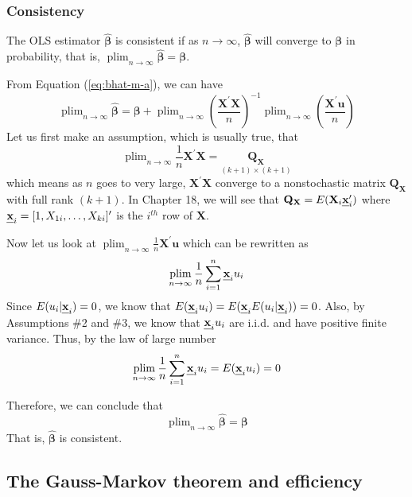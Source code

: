 \documentclass[a4paper,11pt]{article}
\DeclareMathOperator*{\plim}{plim}
\def\mathbi#1{\textbf{\em #1}}
\begin{document}
\subsubsection*{Consistency}
\label{sec:orgd0e2098}

The OLS estimator \(\hat{\boldsymbol{\beta}}\) is consistent if as \(n
\rightarrow \infty\), \(\hat{\boldsymbol{\beta}}\) will converge to
\(\boldsymbol{\beta}\) in probability, that is, \(\plim_{n \rightarrow
\infty} \hat{\boldsymbol{\beta}} = \boldsymbol{\beta}\).

From Equation (\ref{eq:bhat-m-a}), we can have
\begin{equation*}
\plim_{n \rightarrow \infty} \hat{\boldsymbol{\beta}} = \boldsymbol{\beta} + \plim_{n \rightarrow \infty} \left(\frac{\mathbf{X}^{\prime} \mathbf{X}}{n} \right)^{-1} \plim_{n \rightarrow \infty}\left( \frac{\mathbf{X}^{\prime} \mathbf{u}}{n} \right)
\end{equation*}
Let us first  make an assumption, which is usually true, that
\begin{equation}
\label{eq:plim-bhat-m}
 \plim_{n \rightarrow \infty} \frac{1}{n} \mathbf{X}^{\prime}
\mathbf{X} = \underset{(k+1) \times (k+1)}{\mathbf{Q_X}}
\end{equation}
which means as \(n\) goes to very large, \(\mathbf{X}^{\prime}
\mathbf{X}\) converge to a nonstochastic matrix \(\mathbf{Q_X}\) with
full rank \((k + 1)\). In Chapter 18, we will see that \(\mathbf{Q_X} =
E(\mathbf{X}_i \mathbi{x}_i^{\prime})\) where \(\mathbi{x}_i = [1,
X_{1i}, \ldots, X_{ki}]^{\prime}\) is the \(i^{th}\) row of
\(\mathbf{X}\).

Now let us look at \(\plim_{n \rightarrow \infty} \frac{1}{n}
\mathbf{X}^{\prime} \mathbf{u}\) which can be rewritten as
\[ \plim_{n \rightarrow \infty} \frac{1}{n} \sum_{i=1}^n \mathbi{x}_i
u_i \]
Since \(E(u_i | \mathbi{x}_i) = 0\), we know that \(E(\mathbi{x}_i u_i) =
E(\mathbi{x}_iE(u_i | \mathbi{x}_i)) = 0\). Also, by Assumptions \#2 and
\#3, we know that \(\mathbi{x}_i u_i\) are i.i.d. and have positive
finite variance. Thus, by the law of large number
\[ \plim_{n \rightarrow  \infty} \frac{1}{n} \sum_{i=1}^n \mathbi{x}_i u_i = E(\mathbi{x}_i
u_i) = 0 \]

Therefore, we can conclude that
\[ \plim_{n \rightarrow \infty} \hat{\boldsymbol{\beta}} = \boldsymbol{\beta}  \]
That is, \(\hat{\boldsymbol{\beta}}\) is consistent.


\subsection{The Gauss-Markov theorem and efficiency}
\label{sec:org5a90d6a}
\end{document}
